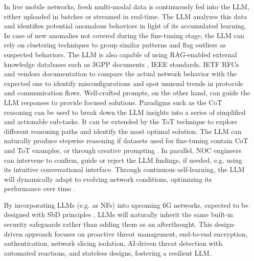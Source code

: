 In live mobile networks, fresh multi-modal data is continuously fed into the \gls{LLM}, either uploaded in batches or streamed in real-time. The \gls{LLM} analyzes this data and identifies potential anomalous behaviors in light of its accumulated learning. In case of new anomalies not covered during the fine-tuning stage, the \gls{LLM} can rely on clustering techniques to group similar patterns and flag outliers as suspected behaviors. The \gls{LLM} is also capable of using \gls{RAG}-enabled external knowledge databases such as \gls{3GPP} documents \cite{Said2024instruct}, \gls{IEEE} standards, \gls{IETF} RFCs and vendors documentation \cite{soman2023observations} to compare the actual network behavior with the expected one to identify misconfigurations and spot unusual trends in protocols and communication flows. Well-crafted prompts, on the other hand, can guide the \gls{LLM} responses to provide focused solutions. Paradigms such as the \gls{CoT} reasoning can be used to break down the \gls{LLM} insights into a series of simplified and actionable sub-tasks. It can be extended by the \gls{ToT} technique to explore different reasoning paths and identify the most optimal solution. The \gls{LLM} can naturally produce stepwise reasoning if datasets used for fine-tuning contain \gls{CoT} and \gls{ToT} examples, or through creative prompting \cite{Zhou2024survey}. In parallel, \gls{NOC} engineers can intervene to confirm, guide or reject the \gls{LLM} findings, if needed, e.g. using its intuitive conversational interface. Through continuous self-learning, the \gls{LLM} will dynamically adapt to evolving network conditions, optimizing its performance over time \cite{Chaparadza2023optimization}.


By incorporating \glspl{LLM} (e.g. as \glspl{NF}) into upcoming 6G networks, expected to be designed with \gls{SbD} principles \cite{Khaloopour2024Resilience}, \glspl{LLM} will naturally inherit the same built-in security safeguards rather than adding them as an afterthought. This design-driven approach focuses on proactive threat management, end-to-end encryption, authentication, network slicing isolation, \gls{AI}-driven threat detection with automated reactions, and stateless designs, fostering a resilient \gls{LLM}.


